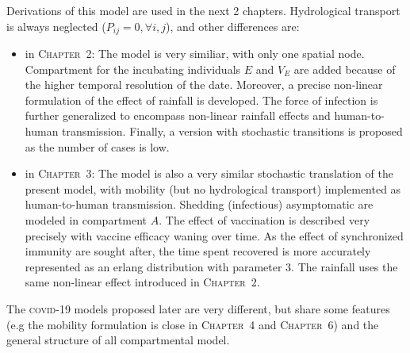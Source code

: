 Derivations of this model are used in the next 2 chapters. Hydrological transport is always neglected ($P_{ij}=0, \forall i,j$), and other differences are:
\begin{itemize}
	\item in \textsc{Chapter~2}: The model is very similiar, with only one spatial node. Compartment for the incubating individuals $E$ and $V_E$ are added because of the higher temporal resolution of the date. Moreover, a precise non-linear formulation of the effect of rainfall is developed. The force of infection is further generalized to encompass non-linear rainfall effects and human-to-human transmission. Finally, a version with stochastic transitions is proposed as the number of cases is low.
	\item in \textsc{Chapter~3}: The model is also a very similar stochastic translation of the present model, with mobility (but no hydrological transport) implemented as human-to-human transmission. Shedding (infectious) asymptomatic are modeled in compartment $A$. The effect of vaccination is described very precisely with vaccine efficacy waning over time. As the effect of synchronized immunity are sought after,  the time spent recovered is more accurately represented as an erlang distribution with parameter 3. The rainfall uses the same non-linear effect introduced in \textsc{Chapter~2}. 
\end{itemize}
The \textsc{covid}-19 models proposed later are very different, but share some features (e.g the mobility formulation is close in \textsc{Chapter~4} and \textsc{Chapter~6}) and the general structure of all compartmental model.
